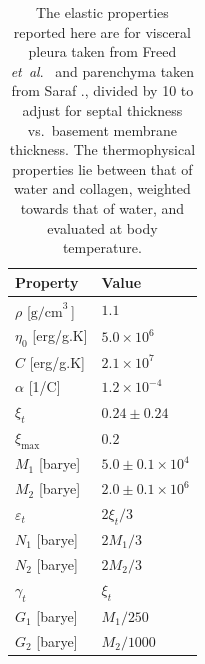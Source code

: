 \begin{table}
    \centering
    \begin{tabular}{|l|l|}
        \hline
        Property & Value \\ \hline
        $\rho$ \hfill [$\textrm{g/cm}^{3^{\phantom{|}}}$] & $1.1$ \\
        $\eta_0$ \hfill [erg/g.K] & $5.0 \times 10^6$ \\
        $C$ \hfill [erg/g.K] & $2.1 \times 10^7$ \\
        $\alpha$ \hfill [1/C] & $1.2 \times 10^{-4}$ \\ \hline
        $\xi_t$ & $0.24 \pm 0.24$ \\
        $\xi_{\max}$ & $0.2$ \\
        $M_1$ \hfill [barye] & $5.0 \pm 0.1 \times 10^4$ \\
        $M_2$ \hfill [barye] & $2.0 \pm 0.1 \times 10^6$ \\ \hline
        $\varepsilon_t$ & $2 \xi_t / 3$ \\
        $N_1$ \hfill [barye] & $2M_1/3$ \\
        $N_2$ \hfill [barye] & $2M_2/3$ \\ \hline
        $\gamma_t$ & $\xi_t$ \\
        $G_1$ \hfill [barye] & $M_1 / 250$ \\
        $G_2$ \hfill [barye] & $M_2 / 1000$ \\ \hline
    \end{tabular}
    \caption{The elastic properties reported here are for visceral pleura taken from Freed \textit{et~al}.\ \cite{Freedetal17} and parenchyma taken from Saraf ., \cite{Sarafetal07} divided by 10 to adjust for septal thickness vs.\ basement membrane thickness.  The thermo\-physical properties lie between that of water and collagen, weighted towards that of water, and evaluated at body temperature.}
    \label{tableVisceralPleura}
\end{table}

